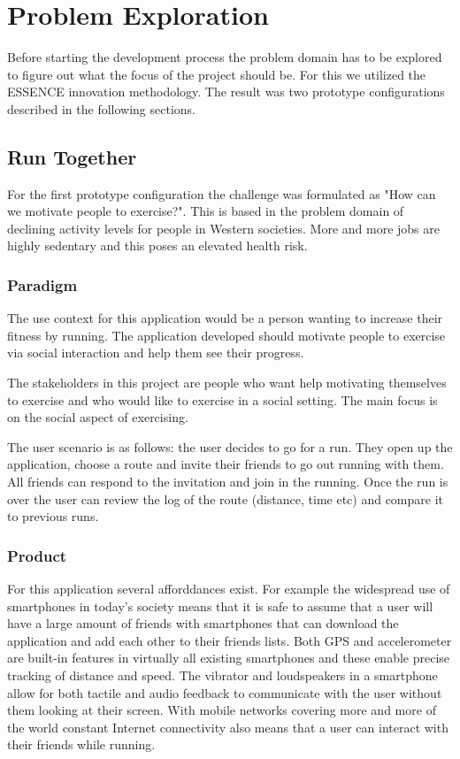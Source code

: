 \section{Problem Exploration}
Before starting the development process the problem domain has to be explored to figure out what the focus of the project should be. For this we utilized the ESSENCE innovation methodology. The result was two prototype configurations described in the following sections.

\subsection{Run Together}
For the first prototype configuration the challenge was formulated as "How can we motivate people to exercise?". This is based in the problem domain of declining activity levels for people in Western societies. More and more jobs are highly sedentary and this poses an elevated health risk. 
\vspace{10pt}

\subsubsection{Paradigm}
The use context for this application would be a person wanting to increase their fitness by running. The application developed should motivate people to exercise via social interaction and help them see their progress.
\vspace{10pt}

The stakeholders in this project are people who want help motivating themselves to exercise and who would like to exercise in a social setting. The main focus is on the social aspect of exercising. 
\vspace{10pt}

The user scenario is as follows: the user decides to go for a run. They open up the application, choose a route and invite their friends to go out running with them. All friends can respond to the invitation and join in the running. Once the run is over the user can review the log of the route (distance, time etc) and compare it to previous runs.  

\subsubsection{Product}
For this application several afforddances exist. For example the widespread use of smartphones in today's society means that it is safe to assume that a user will have a large amount of friends with smartphones that can download the application and add each other to their friends lists. Both \ac{GPS} and accelerometer are built-in features in virtually all existing smartphones and these enable precise tracking of distance and speed. The vibrator and loudspeakers in a smartphone allow for both tactile and audio feedback to communicate with the user without them looking at their screen. With mobile networks covering more and more of the world constant Internet connectivity also means that a user can interact with their friends while running.
\vspace{10pt}

